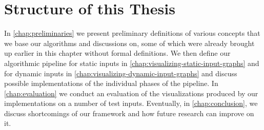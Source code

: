 \section{Structure of this Thesis}
\label{sect:structure-of-this-thesis}

In \cref{chap:preliminaries} we present preliminary definitions of various concepts that we base our algorithms and discussions on, some of which were already brought up earlier in this chapter without formal definitions.
We then define our algorithmic pipeline for static inputs in \cref{chap:visualizing-static-input-graphs} and for dynamic inputs in \cref{chap:visualizing-dynamic-input-graphs} and discuss possible implementations of the individual phases of the pipeline.
In \cref{chap:evaluation} we conduct an evaluation of the visualizations produced by our implementations on a number of test inputs.
Eventually, in \cref{chap:conclusion}, we discuss shortcomings of our framework and how future research can improve on it.
